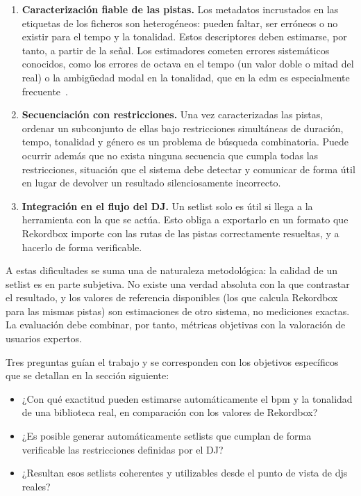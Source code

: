 \begin{enumerate}
  \item \textbf{Caracterización fiable de las pistas.} Los metadatos incrustados en las etiquetas de los ficheros son heterogéneos: pueden faltar, ser erróneos o no existir para el tempo y la tonalidad. Estos descriptores deben estimarse, por tanto, a partir de la señal. Los estimadores cometen errores sistemáticos conocidos, como los errores de octava en el tempo (un valor doble o mitad del real) o la ambigüedad modal en la tonalidad, que en la \acf{edm} es especialmente frecuente~\cite{faraldo2016key}.
  \item \textbf{Secuenciación con restricciones.} Una vez caracterizadas las pistas, ordenar un subconjunto de ellas bajo restricciones simultáneas de duración, tempo, tonalidad y género es un problema de búsqueda combinatoria. Puede ocurrir además que no exista ninguna secuencia que cumpla todas las restricciones, situación que el sistema debe detectar y comunicar de forma útil en lugar de devolver un resultado silenciosamente incorrecto.
  \item \textbf{Integración en el flujo del DJ.} Un setlist solo es útil si llega a la herramienta con la que se actúa. Esto obliga a exportarlo en un formato que Rekordbox importe con las rutas de las pistas correctamente resueltas, y a hacerlo de forma verificable.
\end{enumerate}

A estas dificultades se suma una de naturaleza metodológica: la calidad de un setlist es en parte subjetiva. No existe una verdad absoluta con la que contrastar el resultado, y los valores de referencia disponibles (los que calcula Rekordbox para las mismas pistas) son estimaciones de otro sistema, no mediciones exactas. La evaluación debe combinar, por tanto, métricas objetivas con la valoración de usuarios expertos.

Tres preguntas guían el trabajo y se corresponden con los objetivos específicos que se detallan en la sección siguiente:
\begin{itemize}
  \item ¿Con qué exactitud pueden estimarse automáticamente el \acs{bpm} y la tonalidad de una biblioteca real, en comparación con los valores de Rekordbox?
  \item ¿Es posible generar automáticamente setlists que cumplan de forma verificable las restricciones definidas por el DJ?
  \item ¿Resultan esos setlists coherentes y utilizables desde el punto de vista de \acsp{dj} reales?
\end{itemize}

